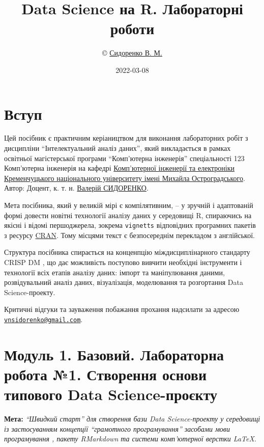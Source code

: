 \documentclass[
]{book}
\title{Data Science на R. Лабораторні роботи}
\author{© \href{https://www.linkedin.com/in/valeriy-sydorenko-6782279a/}{Сидоренко В. М.}}
\date{2022-03-08}
\begin{document}
\maketitle

{
\setcounter{tocdepth}{1}
\tableofcontents
}
\hypertarget{ux432ux441ux442ux443ux43f}{%
\chapter{Вступ}\label{ux432ux441ux442ux443ux43f}}

Цей посібник є практичним керіаництвом для виконання лабораторних робіт з дисципліни ``Інтелектуальний аналіз даних'', який викладається в рамках освітньої магістерської програми ``Комп'ютерна інженерія'' спеціальності 123 Комп'ютерна інженерія на кафедрі \href{http://cis.kdu.edu.ua/}{Комп'ютерної інженерії та електроніки} \href{http://www.kdu.edu.ua/}{Кременчуцького національного університету імені Михайла Остроградського}. Автор: Доцент, к. т. н. \href{https://www.linkedin.com/in/valeriy-sydorenko-6782279a/}{Валерій СИДОРЕНКО}.

Мета посібника, який у великій мірі є компілятивним, -- у зручній і адаптованій формі довести новітні технології аналізу даних у середовищі R, спираючись на якісні і відомі першоджерела, зокрема \texttt{vignetts} відповідних програмних пакетів з ресурсу \href{https://cran.r-project.org/}{CRAN}. Тому місцями текст є безпосереднім перекладом з англійської.

Структура посібника спирається на конценпцію міждисциплінарного стандарту CRISP DM \citep{CRISP_DM}, що дає можливість поступово вивчити необхідні інструменти і технології всіх етапів аналізу даних: імпорт та маніпулювання даними, розвідувальний аналіз даних, візуалізація, моделювання та розгортання Data Science-проекту.

Критичні відгуки та зауваження побажання прохання надсилати за адресою \href{mailto:vnsidorenko@gmail.com}{\nolinkurl{vnsidorenko@gmail.com}}.

\hypertarget{modul1}{%
\chapter{Модуль 1. Базовий. Лабораторна робота №1. Створення основи типового Data Science-проєкту}\label{modul1}}

\textbf{Мета:} \emph{``Швидкий старт'' для створення бази Data Science-проекту у середовищі \citep{R-Studio} із застосуванням концепції ``грамотного програмування'' засобами мови програмування \citep{R-base}, пакету RMarkdown та системи комп'ютерної верстки LaTeX}.
\end{document}
